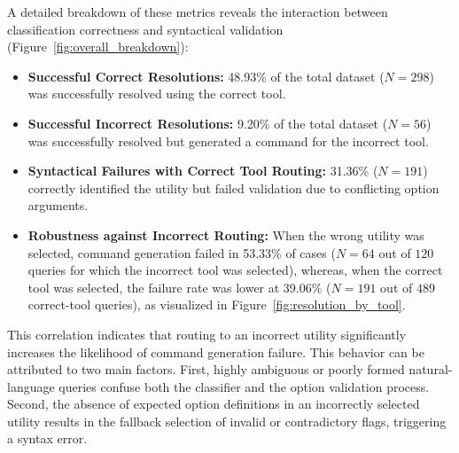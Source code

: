 A detailed breakdown of these metrics reveals the interaction between classification correctness and syntactical validation (Figure~\ref{fig:overall_breakdown}):
\begin{itemize}
    \item \textbf{Successful Correct Resolutions:} 48.93\% of the total dataset ($N=298$) was successfully resolved using the correct tool.
    \item \textbf{Successful Incorrect Resolutions:} 9.20\% of the total dataset ($N=56$) was successfully resolved but generated a command for the incorrect tool.
    \item \textbf{Syntactical Failures with Correct Tool Routing:} 31.36\% ($N=191$) correctly identified the utility but failed validation due to conflicting option arguments.
    \item \textbf{Robustness against Incorrect Routing:} When the wrong utility was selected, command generation failed in 53.33\% of cases ($N=64$ out of $120$ queries for which the incorrect tool was selected), whereas, when the correct tool was selected, the failure rate was lower at 39.06\% ($N=191$ out of $489$ correct-tool queries), as visualized in Figure~\ref{fig:resolution_by_tool}. 
\end{itemize}

This correlation indicates that routing to an incorrect utility significantly increases the likelihood of command generation failure. This behavior can be attributed to two main factors. First, highly ambiguous or poorly formed natural-language queries confuse both the classifier and the option validation process. Second, the absence of expected option definitions in an incorrectly selected utility results in the fallback selection of invalid or contradictory flags, triggering a syntax error.

